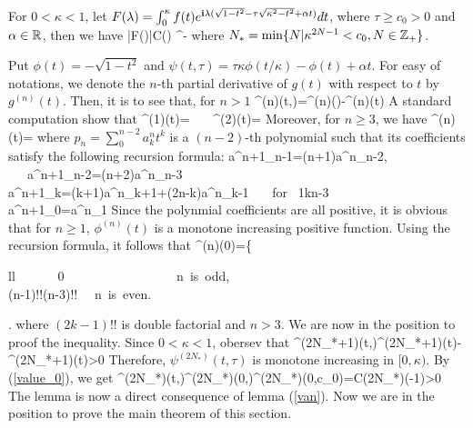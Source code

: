 \documentclass[12pt]{iopart}
\begin{document}
\begin{lem}\label{cross_term}
	For $0<\kappa<1$, let $F(\lambda)=\int_{0}^{\kappa}f(t)e^{\mathbf{i}\lambda(\sqrt{1-t^2}-\tau\sqrt{\kappa^2-t^2}+\alpha t)}dt$, where $\tau\geq c_0>0$ and $\alpha\in\mathbb{R}$, then we have
	\ben
	|F(\lambda)|\leq C(\kappa) \lambda^{-} 
	\een
	where $N_*=\min\{N|\kappa^{2N-1}<c_0,N\in {\mathbb{Z}}_+ \}$.
\end{lem}
\debproof
Put $\phi(t)=-\sqrt{1-t^2}$ and $\psi(t,\tau)=\tau\kappa\phi(t/\kappa)-\phi(t)+\alpha t$. For easy of notations, we denote the $n$-th partial derivative of $g(t)$ with respect to $t$ by $g^{(n)}(t)$. Then, it is to see that, for $n>1$
\ben
\psi^{(n)}(t,\tau)=\phi^{(n)}()-\phi^{(n)}(t)
\een
A standard computation show that
\ben
\phi^{(1)}(t)=  \ \ \
\phi^{(2)}(t)=
\een
Moreover, for $n\geq3$, we have
\be
\phi^{(n)}(t)=
\ee
where $p_n=\sum_{0}^{n-2}a^n_{k}t^k$ is a $(n-2)$-th polynomial such that its  coefficients satisfy the following recursion formula:
\ben
a^{n+1}_{n-1}=(n+1)a^n_{n-2}, \ \ \ a^{n+1}_{n-2}=(n+2)a^n_{n-3} \\
a^{n+1}_{k}=(k+1)a^n_{k+1}+(2n-k)a^n_{k-1} \ \ \ \mbox{for} \ 1\leq k\leq n-3 \\
a^{n+1}_{0}=a^n_{1}
\een
Since the polynmial coefficients are all positive, it is obvious that for $n\geq 1$, $\phi^{(n)}(t)$ is a monotone increasing positive function. Using the recursion formula, it follows that
\be \label{value_0}
\phi^{(n)}(0)=\left\{ \begin{array}{ll}
	\ \ \ \ \ \ 	0  \ \ \ \ \ \ \ \ \ \ \  \ \ \ \ \ \  \mbox{n is odd},\\
	(n-1)!!(n-3)!! \ \ \mbox{n is even}.
\end{array} \right.
\ee
where $(2k-1)!!$ is double factorial and $n>3$. We are now in the position to proof the inequality. Since $0<\kappa<1$, obersev that 
\ben
\psi^{(2N_*+1)}(t,\tau)\geq {}\phi^{(2N_*+1)}(t)-\phi^{(2N_*+1)}(t)>0
\een
Therefore, $\psi^{(2N_*)}(t,\tau)$ is monotone increasing in $[0,\kappa)$. By (\ref{value_0}), we get
\be\hspace{-1.5cm}
\psi^{(2N_*)}(t,\tau)\geq\psi^{(2N_*)}(0,\tau)\geq\psi^{(2N_*)}(0,c_0)=C(2N_*)(-1)>0
\ee
The lemma is now a direct consequence of lemma (\ref{van}).
\finproof
Now we are in the position to prove the main theorem of this section.
\end{document}
